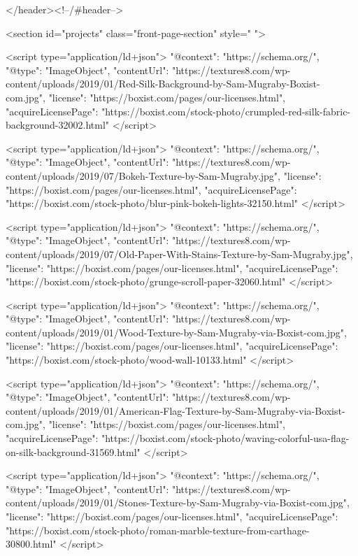 </header><!--/#header-->


<section id="projects" class="front-page-section" style="
">
		
	
	<script type="application/ld+json"> { 
	"@context": "https://schema.org/", "@type": "ImageObject", "contentUrl": "https://textures8.com/wp-content/uploads/2019/01/Red-Silk-Background-by-Sam-Mugraby-Boxist-com.jpg", 
	"license": "https://boxist.com/pages/our-licenses.html",
	"acquireLicensePage": "https://boxist.com/stock-photo/crumpled-red-silk-fabric-background-32002.html" } 
	</script>
	
     <script type="application/ld+json">
    {
      "@context": "https://schema.org/",
      "@type": "ImageObject",
      "contentUrl": "https://textures8.com/wp-content/uploads/2019/07/Bokeh-Texture-by-Sam-Mugraby.jpg",
      "license": "https://boxist.com/pages/our-licenses.html",
      "acquireLicensePage": "https://boxist.com/stock-photo/blur-pink-bokeh-lights-32150.html"
    }
    </script>
    
       <script type="application/ld+json">
    {
      "@context": "https://schema.org/",
      "@type": "ImageObject",
      "contentUrl": "https://textures8.com/wp-content/uploads/2019/07/Old-Paper-With-Stains-Texture-by-Sam-Mugraby.jpg",
      "license": "https://boxist.com/pages/our-licenses.html",
      "acquireLicensePage": "https://boxist.com/stock-photo/grunge-scroll-paper-32060.html"
    }
    </script>
    
         <script type="application/ld+json">
    {
      "@context": "https://schema.org/",
      "@type": "ImageObject",
      "contentUrl": "https://textures8.com/wp-content/uploads/2019/01/Wood-Texture-by-Sam-Mugraby-via-Boxist-com.jpg",
      "license": "https://boxist.com/pages/our-licenses.html",
      "acquireLicensePage": "https://boxist.com/stock-photo/wood-wall-10133.html"
    }
    </script>
    
         <script type="application/ld+json">
    {
      "@context": "https://schema.org/",
      "@type": "ImageObject",
      "contentUrl": "https://textures8.com/wp-content/uploads/2019/01/American-Flag-Texture-by-Sam-Mugraby-via-Boxist-com.jpg",
      "license": "https://boxist.com/pages/our-licenses.html",
      "acquireLicensePage": "https://boxist.com/stock-photo/waving-colorful-usa-flag-on-silk-background-31569.html"
    }
    </script>
    
         <script type="application/ld+json">
    {
      "@context": "https://schema.org/",
      "@type": "ImageObject",
      "contentUrl": "https://textures8.com/wp-content/uploads/2019/01/Stones-Texture-by-Sam-Mugraby-via-Boxist-com.jpg",
      "license": "https://boxist.com/pages/our-licenses.html",
      "acquireLicensePage": "https://boxist.com/stock-photo/roman-marble-texture-from-carthage-30800.html"
    }
    </script>
    
